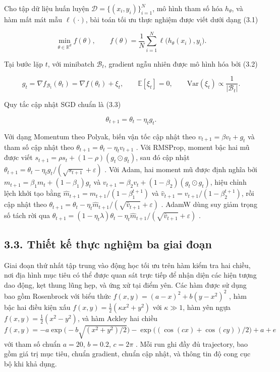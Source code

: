 \documentclass[a4paper,12pt]{article}
\begin{document}
Cho tập dữ liệu huấn luyện $\mathcal{D}=\{(x_i,y_i)\}_{i=1}^N$, mô hình tham số hóa $h_\theta$, và hàm mất mát mẫu $\ell(\cdot)$, bài toán tối ưu thực nghiệm được viết dưới dạng (3.1)

\begin{equation}
\min_{\theta\in\mathbb{R}^d} f(\theta), \qquad f(\theta)=\frac{1}{N}\sum_{i=1}^N \ell\big(h_\theta(x_i),y_i\big).\tag{3.1}
\end{equation}

Tại bước lặp $t$, với minibatch $\mathcal{B}_t$, gradient ngẫu nhiên được mô hình hóa bởi (3.2)

\begin{equation}
g_t = \nabla f_{\mathcal{B}_t}(\theta_t) = \nabla f(\theta_t) + \xi_t, \qquad
\mathbb{E}[\xi_t]=0, \qquad \mathrm{Var}(\xi_t)\propto \frac{1}{|\mathcal{B}_t|}.\tag{3.2}
\end{equation}

Quy tắc cập nhật SGD chuẩn là (3.3)

\begin{equation}
θ_{t+1}=θ_t-η_t g_t.\tag{3.3}
\end{equation}

Với dạng Momentum theo Polyak, biến vận tốc cập nhật theo $v_{t+1}=\beta v_t+g_t$ và tham số cập nhật theo $\theta_{t+1}=\theta_t-\eta_t v_{t+1}$ \cite{ref2}. Với RMSProp, moment bậc hai mũ được viết $s_{t+1}=\rho s_t+(1-\rho)(g_t\odot g_t)$, sau đó cập nhật $\theta_{t+1}=\theta_t-\eta_t g_t/(\sqrt{s_{t+1}}+\varepsilon)$ \cite{ref3}. Với Adam, hai moment mũ được định nghĩa bởi $m_{t+1}=\beta_1m_t+(1-\beta_1)g_t$ và $v_{t+1}=\beta_2v_t+(1-\beta_2)(g_t\odot g_t)$, hiệu chỉnh lệch khởi tạo bằng $\hat m_{t+1}=m_{t+1}/(1-\beta_1^{t+1})$ và $\hat v_{t+1}=v_{t+1}/(1-\beta_2^{t+1})$, rồi cập nhật theo $\theta_{t+1}=\theta_t-\eta_t\hat m_{t+1}/(\sqrt{\hat v_{t+1}}+\varepsilon)$ \cite{ref4}. AdamW dùng suy giảm trọng số tách rời qua $\theta_{t+1}=(1-\eta_t\lambda)\theta_t-\eta_t\hat m_{t+1}/(\sqrt{\hat v_{t+1}}+\varepsilon)$ \cite{ref5}.

\subsection{3.3. Thiết kế thực nghiệm ba giai đoạn}

Giai đoạn thứ nhất tập trung vào động học tối ưu trên hàm kiểm tra hai chiều, nơi địa hình mục tiêu có thể được quan sát trực tiếp để nhận diện các hiện tượng dao động, kẹt thung lũng hẹp, và ứng xử tại điểm yên. Các hàm được sử dụng bao gồm Rosenbrock với biểu thức $f(x,y)=(a-x)^2+b(y-x^2)^2$ \cite{ref6}, hàm bậc hai điều kiện xấu $f(x,y)=\tfrac{1}{2}(\kappa x^2+y^2)$ với $\kappa\gg1$, hàm yên ngựa $f(x,y)=\tfrac{1}{2}(x^2-y^2)$, và hàm Ackley hai chiều $f(x,y)=-a\exp\big(-b\sqrt{(x^2+y^2)/2}\big)-\exp\big((\cos(cx)+\cos(cy))/2\big)+a+e$ với tham số chuẩn $a=20$, $b=0.2$, $c=2\pi$ \cite{ref7}. Mỗi run ghi đầy đủ trajectory, bao gồm giá trị mục tiêu, chuẩn gradient, chuẩn cập nhật, và thông tin độ cong cục bộ khi khả dụng.
\end{document}

